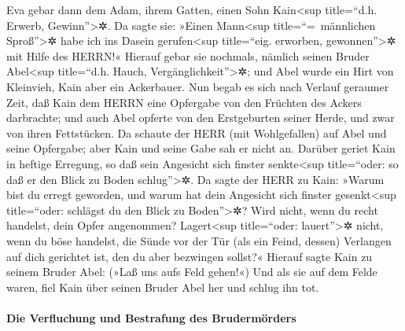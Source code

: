  Eva gebar dann dem Adam, ihrem Gatten, einen Sohn
Kain\textless sup title=``d.h. Erwerb, Gewinn''\textgreater✲. Da sagte
sie: »Einen Mann\textless sup title=``=~männlichen Sproß''\textgreater✲
habe ich ins Dasein gerufen\textless sup title=``eig. erworben,
gewonnen''\textgreater✲ mit Hilfe des HERRN!«  Hierauf
gebar sie nochmals, nämlich seinen Bruder Abel\textless sup title=``d.h.
Hauch, Vergänglichkeit''\textgreater✲; und Abel wurde ein Hirt von
Kleinvieh, Kain aber ein Ackerbauer.  Nun begab es sich
nach Verlauf geraumer Zeit, daß Kain dem HERRN eine Opfergabe von den
Früchten des Ackers darbrachte;  und auch Abel opferte von
den Erstgeburten seiner Herde, und zwar von ihren Fettstücken. Da
schaute der HERR (mit Wohlgefallen) auf Abel und seine Opfergabe;
 aber Kain und seine Gabe sah er nicht an. Darüber geriet
Kain in heftige Erregung, so daß sein Angesicht sich finster
senkte\textless sup title=``oder: so daß er den Blick zu Boden
schlug''\textgreater✲.  Da sagte der HERR zu Kain: »Warum
bist du erregt geworden, und warum hat dein Angesicht sich finster
gesenkt\textless sup title=``oder: schlägst du den Blick zu
Boden''\textgreater✲?  Wird nicht, wenn du recht handelst,
dein Opfer angenommen? Lagert\textless sup title=``oder:
lauert''\textgreater✲ nicht, wenn du böse handelst, die Sünde vor der
Tür (als ein Feind, dessen) Verlangen auf dich gerichtet ist, den du
aber bezwingen sollst?«  Hierauf sagte Kain zu seinem
Bruder Abel: (»Laß uns aufs Feld gehen!«) Und als sie auf dem Felde
waren, fiel Kain über seinen Bruder Abel her und schlug ihn tot.

\hypertarget{die-verfluchung-und-bestrafung-des-brudermuxf6rders}{%
\paragraph{Die Verfluchung und Bestrafung des
Brudermörders}\label{die-verfluchung-und-bestrafung-des-brudermuxf6rders}}

